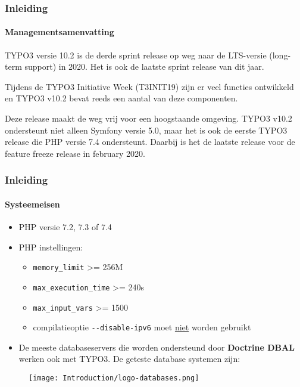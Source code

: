 \begin{frame}[fragile]
	\frametitle{Inleiding}
	\framesubtitle{Managementsamenvatting}

	\small
		TYPO3 versie 10.2 is de derde sprint release op weg naar de LTS-versie
		(long-term support) in 2020. Het is ook de laatste sprint release van dit
		jaar.

		\vspace{0.2cm}

		Tijdens de TYPO3 Initiative Week (T3INIT19) zijn er veel functies ontwikkeld
		en TYPO3 v10.2 bevat reeds een aantal van deze componenten.

		\vspace{0.2cm}

		Deze release maakt de weg vrij voor een hoogstaande omgeving. TYPO3 v10.2 ondersteunt
		niet alleen Symfony versie 5.0, maar het is ook de eerste TYPO3 release die
		PHP versie 7.4 ondersteunt. Daarbij is het de laatste release voor de feature freeze
		release in february 2020.

	\normalsize

\end{frame}


\begin{frame}[fragile]
	\frametitle{Inleiding}
	\framesubtitle{Systeemeisen}

	\begin{itemize}
		\item PHP versie 7.2, 7.3 of 7.4
		\item PHP instellingen:

			\begin{itemize}
				\item \texttt{memory\_limit} >= 256M
				\item \texttt{max\_execution\_time} >= 240s
				\item \texttt{max\_input\_vars} >= 1500
				\item compilatieoptie \texttt{-}\texttt{-disable-ipv6} moet \underline{niet} worden gebruikt
			\end{itemize}

		\item De meeste databaseservers die worden ondersteund door \textbf{Doctrine DBAL} werken ook met TYPO3.
			De geteste database systemen zijn:
	\end{itemize}

	\begin{figure}
		\texttt{[image: Introduction/logo-databases.png]}
	\end{figure}

\end{frame}

